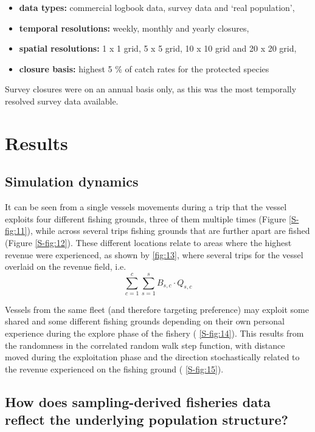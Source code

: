 \documentclass[review]{elsarticle}
\begin{document}
\begin{itemize}
	\item \textbf{data types:} commercial logbook data, survey data and
		`real population',
	\item \textbf{temporal resolutions:} weekly, monthly and yearly
		closures,
	\item \textbf{spatial resolutions:} 1 x 1 grid, 5 x 5 grid, 10 x 10
		grid and 20 x 20 grid,
	\item \textbf{closure basis:} highest 5 \%  of catch rates for the
		protected species
\end{itemize}

Survey closures were on an annual basis only, as this was the most temporally
resolved survey data available.

\section{Results}

\subsection{Simulation dynamics}

It can be seen from a single vessels movements during a trip that the vessel
exploits four different fishing grounds, three of them multiple times (Figure
\ref{S-fig:11}), while across several trips fishing grounds that are further
apart are fished (Figure \ref{S-fig:12}). These different locations relate to
areas where the highest revenue were experienced, as shown by
 \ref{fig:13}, where several trips for the vessel
overlaid on the revenue field, i.e. 
$$\sum^c_{c=1}\sum^s_{s=1} B_{s,c} \cdot Q_{s,c}$$

Vessels from the same fleet (and therefore targeting preference) may exploit
some shared and some different fishing grounds depending on their own personal
experience during the explore phase of the fishery (
\ref{S-fig:14}). This results from the randomness in the correlated random walk
step function, with distance moved during the exploitation phase and the
direction stochastically related to the revenue experienced on the fishing
ground (
\ref{S-fig:15}). 

\subsection{How does sampling-derived fisheries data reflect the underlying
	population structure?}
\end{document}
